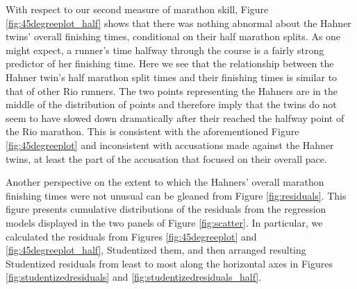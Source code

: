 \documentclass[12pt,titlepage]{article}
\begin{document}
With respect to our second measure of marathon skill, Figure
\ref{fig:45degreeplot_half} shows that there was nothing abnormal
about the Hahner twins' overall finishing times, conditional on their
half marathon splits. As one might expect, a runner's time halfway
through the course is a fairly strong predictor of her finishing time.
Here we see that the relationship between the Hahner twin's half
marathon split times and their finishing times is similar to that of
other Rio runners.  The two points representing the Hahners are in the
middle of the distribution of points and therefore imply that the
twins do not seem to have slowed down dramatically after their reached
the halfway point of the Rio marathon.  This is consistent with the
aforementioned Figure \ref{fig:45degreeplot} and inconsistent with
accusations made against the Hahner twins, at least the part of the
accusation that focused on their overall pace.

Another perspective on the extent to which the Hahners' overall
marathon finishing times were not unusual can be gleaned from Figure
\ref{fig:residuals}.  This figure presents cumulative distributions of
the residuals from the regression models displayed in the two panels
of Figure \ref{fig:scatter}.  In particular, we calculated the
residuals from Figures \ref{fig:45degreeplot} and
\ref{fig:45degreeplot_half}, Studentized them, and then arranged
resulting Studentized residuals from least to most along the
horizontal axes in Figures \ref{fig:studentizedresiduals} and
\ref{fig:studentizedresiduals_half}.\label{residualplots}
\end{document}
